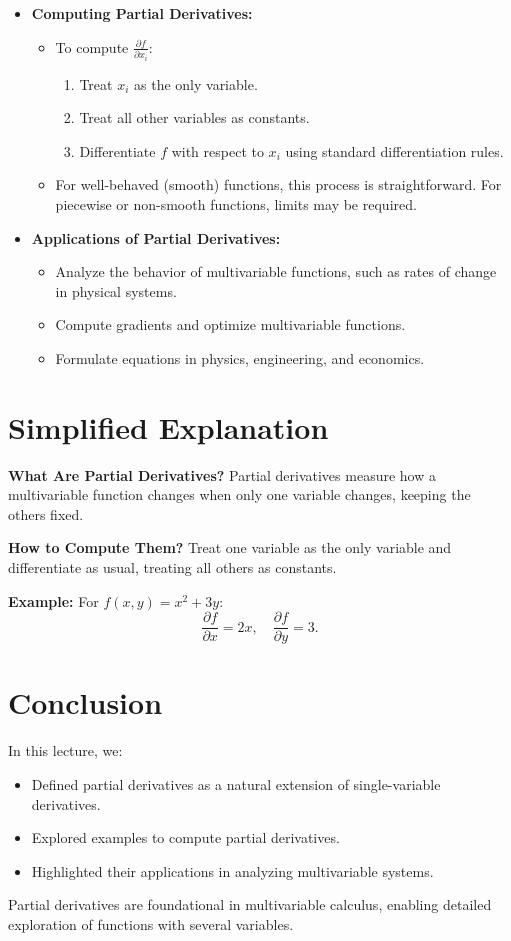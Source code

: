 \documentclass{article}
\begin{document}
\begin{itemize}
  \item \textbf{Computing Partial Derivatives:}
    \begin{itemize}
      \item To compute $\frac{\partial f}{\partial x_i}$:
        \begin{enumerate}
          \item Treat $x_i$ as the only variable.
          \item Treat all other variables as constants.
          \item Differentiate $f$ with respect to $x_i$ using standard differentiation rules.
        \end{enumerate}
      \item For well-behaved (smooth) functions, this process is straightforward. For piecewise or non-smooth functions, limits may be required.
    \end{itemize}

  \item \textbf{Applications of Partial Derivatives:}
    \begin{itemize}
      \item Analyze the behavior of multivariable functions, such as rates of change in physical systems.
      \item Compute gradients and optimize multivariable functions.
      \item Formulate equations in physics, engineering, and economics.
    \end{itemize}
\end{itemize}

\section*{Simplified Explanation}

\textbf{What Are Partial Derivatives?}
Partial derivatives measure how a multivariable function changes when only one variable changes, keeping the others fixed.

\textbf{How to Compute Them?}
Treat one variable as the only variable and differentiate as usual, treating all others as constants.

\textbf{Example:}
For $f(x, y) = x^2 + 3y$:
\[
  \frac{\partial f}{\partial x} = 2x, \quad \frac{\partial f}{\partial y} = 3.
\]

\section*{Conclusion}

In this lecture, we:
\begin{itemize}
  \item Defined partial derivatives as a natural extension of single-variable derivatives.
  \item Explored examples to compute partial derivatives.
  \item Highlighted their applications in analyzing multivariable systems.
\end{itemize}

Partial derivatives are foundational in multivariable calculus, enabling detailed exploration of functions with several variables.
\end{document}
